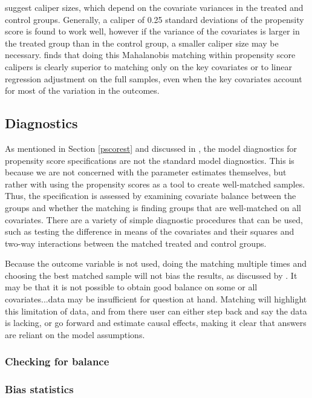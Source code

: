 \documentclass[11pt,titlepage]{article}
\begin{document}
\cite{RosRub85a} suggest caliper sizes, which depend on the covariate variances in the treated and control groups.  Generally, a caliper of 0.25 standard deviations
of the propensity score is found to work well, however if the variance of the covariates is larger in the treated group than in the control group, a smaller caliper
size may be necessary.  \cite{RubTho00} finds that doing this Mahalanobis matching within propensity score calipers is clearly superior to
matching only on the key covariates or to linear regression adjustment on the full samples, even when the key covariates account for most of the variation in the outcomes.

\subsection{Diagnostics}
As mentioned in Section \ref{pscorest} and discussed in \cite{Rubin04}, the model diagnostics for propensity score specifications are not the standard model diagnostics.  This is because we are not
concerned with the parameter estimates themselves, but rather with using the propensity scores as a tool to create well-matched samples.  Thus, the specification is
assessed by examining covariate balance between the groups and whether the matching is finding groups that are well-matched on all covariates.  
There are a variety of simple diagnostic procedures that can be used, such as testing the difference in means of the covariates and their squares and two-way interactions
between the matched treated and control groups.

Because the outcome variable is not used, doing the matching multiple times and choosing the best matched sample will not bias the results, as discussed by \cite{Greevy04}.
It may be that it is not possible to obtain good balance on some or all covariates...data may be insufficient for question at hand.  Matching will highlight this
limitation of data, and from there user can either step back and say the data is lacking, or go forward and estimate causal effects, making it clear that answers
are reliant on the model assumptions.

\subsubsection{Checking for balance}
\subsubsection{Bias statistics}
\end{document}
